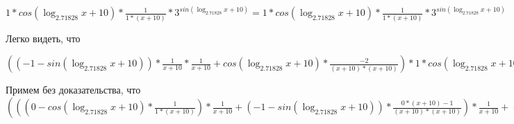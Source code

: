 \documentclass[12pt,a4paper,fleqn]{article}
\theoremstyle{definition}
\begin{document}
$ 1  * cos(\log_{ 2.71828 }{ x  +  10 }) * \frac{ 1 }{ 1  * ( x  +  10 )}
 * { 3 }^{sin(\log_{ 2.71828 }{ x  +  10 })} =  1  * cos(\log_{ 2.71828 }{ x  +  10 }) * \frac{ 1 }{ 1  * ( x  +  10 )}
 * { 3 }^{sin(\log_{ 2.71828 }{ x  +  10 })}$

Легко видеть, что

$(( -1  - sin(\log_{ 2.71828 }{ x  +  10 })) * \frac{ 1 }{ x  +  10 }
 * \frac{ 1 }{ x  +  10 }
 + cos(\log_{ 2.71828 }{ x  +  10 }) * \frac{ -2 }{( x  +  10 ) * ( x  +  10 )}
) *  1  * cos(\log_{ 2.71828 }{ x  +  10 }) * \frac{ 1 }{ 1  * ( x  +  10 )}
 * { 3 }^{sin(\log_{ 2.71828 }{ x  +  10 })} = (( -1  - sin(\log_{ 2.71828 }{ x  +  10 })) * \frac{ 1 }{ x  +  10 }
 * \frac{ 1 }{ x  +  10 }
 + cos(\log_{ 2.71828 }{ x  +  10 }) * \frac{ -2 }{( x  +  10 ) * ( x  +  10 )}
) *  1  * cos(\log_{ 2.71828 }{ x  +  10 }) * \frac{ 1 }{ 1  * ( x  +  10 )}
 * { 3 }^{sin(\log_{ 2.71828 }{ x  +  10 })}$

Примем без доказательства, что
$((( 0  - cos(\log_{ 2.71828 }{ x  +  10 }) * \frac{ 1 }{ 1  * ( x  +  10 )}
) * \frac{ 1 }{ x  +  10 }
 + ( -1  - sin(\log_{ 2.71828 }{ x  +  10 })) * \frac{ 0  * ( x  +  10 ) -  1 }{( x  +  10 ) * ( x  +  10 )}
) * \frac{ 1 }{ x  +  10 }
 + ( -1  - sin(\log_{ 2.71828 }{ x  +  10 })) * \frac{ 1 }{ x  +  10 }
 * \frac{ 0  * ( x  +  10 ) -  1 }{( x  +  10 ) * ( x  +  10 )}
 + ( -1  - sin(\log_{ 2.71828 }{ x  +  10 })) * \frac{ 1 }{ 1  * ( x  +  10 )}
 * \frac{ -2 }{( x  +  10 ) * ( x  +  10 )}
 + cos(\log_{ 2.71828 }{ x  +  10 }) * \frac{ 0  * ( x  +  10 ) * ( x  +  10 ) -  -2  * ( 1  * ( x  +  10 ) + ( x  +  10 ) *  1 )}{( x  +  10 ) * ( x  +  10 ) * ( x  +  10 ) * ( x  +  10 )}
) * { 3 }^{sin(\log_{ 2.71828 }{ x  +  10 })} + (( -1  - sin(\log_{ 2.71828 }{ x  +  10 })) * \frac{ 1 }{ x  +  10 }
 * \frac{ 1 }{ x  +  10 }
 + cos(\log_{ 2.71828 }{ x  +  10 }) * \frac{ -2 }{( x  +  10 ) * ( x  +  10 )}
) *  1  * cos(\log_{ 2.71828 }{ x  +  10 }) * \frac{ 1 }{ 1  * ( x  +  10 )}
 * { 3 }^{sin(\log_{ 2.71828 }{ x  +  10 })} = ((( 0  - cos(\log_{ 2.71828 }{ x  +  10 }) * \frac{ 1 }{ 1  * ( x  +  10 )}
) * \frac{ 1 }{ x  +  10 }
 + ( -1  - sin(\log_{ 2.71828 }{ x  +  10 })) * \frac{ 0  * ( x  +  10 ) -  1 }{( x  +  10 ) * ( x  +  10 )}
) * \frac{ 1 }{ x  +  10 }
 + ( -1  - sin(\log_{ 2.71828 }{ x  +  10 })) * \frac{ 1 }{ x  +  10 }
 * \frac{ 0  * ( x  +  10 ) -  1 }{( x  +  10 ) * ( x  +  10 )}
 + ( -1  - sin(\log_{ 2.71828 }{ x  +  10 })) * \frac{ 1 }{ 1  * ( x  +  10 )}
 * \frac{ -2 }{( x  +  10 ) * ( x  +  10 )}
 + cos(\log_{ 2.71828 }{ x  +  10 }) * \frac{ 0  * ( x  +  10 ) * ( x  +  10 ) -  -2  * ( 1  * ( x  +  10 ) + ( x  +  10 ) *  1 )}{( x  +  10 ) * ( x  +  10 ) * ( x  +  10 ) * ( x  +  10 )}
) * { 3 }^{sin(\log_{ 2.71828 }{ x  +  10 })} + (( -1  - sin(\log_{ 2.71828 }{ x  +  10 })) * \frac{ 1 }{ x  +  10 }
 * \frac{ 1 }{ x  +  10 }
 + cos(\log_{ 2.71828 }{ x  +  10 }) * \frac{ -2 }{( x  +  10 ) * ( x  +  10 )}
) *  1  * cos(\log_{ 2.71828 }{ x  +  10 }) * \frac{ 1 }{ 1  * ( x  +  10 )}
 * { 3 }^{sin(\log_{ 2.71828 }{ x  +  10 })}$
\end{document}
